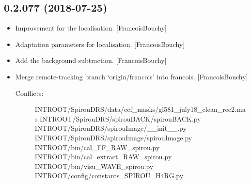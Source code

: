 \documentclass[a4paper,10pt,english]{report}
\begin{document}
\subsection{0.2.077 (2018-07-25)}
\label{\detokenize{misc/changelog:id383}}\begin{itemize}
\item {} 
Improvement for the localisation. {[}FrancoisBouchy{]}

\item {} 
Adaptation parameters for localisation. {[}FrancoisBouchy{]}

\item {} 
Add the background subtraction. {[}FrancoisBouchy{]}

\item {} 
Merge remote-tracking branch ‘origin/francois’ into francois.
{[}FrancoisBouchy{]}
\begin{description}
\item[{Conflicts:}] \leavevmode
INTROOT/SpirouDRS/data/ccf\_masks/gl581\_july18\_clean\_rec2.mas
INTROOT/SpirouDRS/spirouBACK/spirouBACK.py
INTROOT/SpirouDRS/spirouImage/\_\_init\_\_.py
INTROOT/SpirouDRS/spirouImage/spirouImage.py
INTROOT/bin/cal\_FF\_RAW\_spirou.py
INTROOT/bin/cal\_extract\_RAW\_spirou.py
INTROOT/bin/visu\_WAVE\_spirou.py
INTROOT/config/constants\_SPIROU\_H4RG.py

\end{description}

\end{itemize}
\end{document}
